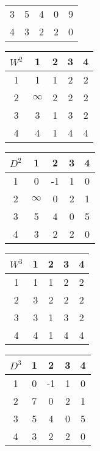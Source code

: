 \documentclass{article}
\begin{document}
\begin{enumerate}[label=(\alph*)]
\begin{center}
\begin{tabular}{c|cccc}
				3 & \cellcolor{blue!20}5 & 4 & 0 & 9 \\
				4 & \cellcolor{blue!20}3 & 2 & 2 & 0
			\end{tabular}
		\end{center}
		\begin{center}
			\begin{tabular}{c|cccc}
				$W^2$ & 1 & 2 & 3 & 4 \\
				\hline
				1 & 1 & \cellcolor{blue!20}1 & 2 & 2 \\
				2 & \cellcolor{blue!20}$\infty$ & \cellcolor{blue!20}2 & \cellcolor{blue!20}2 & \cellcolor{blue!20}2 \\
				3 & 3 & \cellcolor{blue!20}1 & 3 & 2 \\
				4 & 4 & \cellcolor{blue!20}1 & 4 & 4
			\end{tabular}
			\begin{tabular}{c|cccc}
				$D^2$ & 1 & 2 & 3 & 4 \\
				\hline
				1 & 0 & \cellcolor{blue!20}-1 & 1 & 0 \\
				2 & \cellcolor{blue!20}$\infty$ & \cellcolor{blue!20}0 & \cellcolor{blue!20}2 & \cellcolor{blue!20}1 \\
				3 & 5 & \cellcolor{blue!20}4 & 0 & 5 \\
				4 & 3 & \cellcolor{blue!20}2 & 2 & 0
			\end{tabular}
		\end{center}
		\begin{center}
			\begin{tabular}{c|cccc}
				$W^3$ & 1 & 2 & 3 & 4 \\
				\hline
				1 & 1 & 1 & \cellcolor{blue!20}2 & 2 \\
				2 & 3 & 2 & \cellcolor{blue!20}2 & 2 \\
				3 & \cellcolor{blue!20}3 & \cellcolor{blue!20}1 & \cellcolor{blue!20}3 & \cellcolor{blue!20}2 \\
				4 & 4 & 1 & \cellcolor{blue!20}4 & 4
			\end{tabular}
			\begin{tabular}{c|cccc}
				$D^3$ & 1 & 2 & 3 & 4 \\
				\hline
				1 & 0 & -1 & \cellcolor{blue!20}1 & 0 \\
				2 & 7 & 0 & \cellcolor{blue!20}2 & 1 \\
				3 & \cellcolor{blue!20}5 & \cellcolor{blue!20}4 & \cellcolor{blue!20}0 & \cellcolor{blue!20}5 \\
				4 & 3 & 2 & \cellcolor{blue!20}2 & 0
			\end{tabular}

\end{center}
\end{enumerate}
\end{document}
